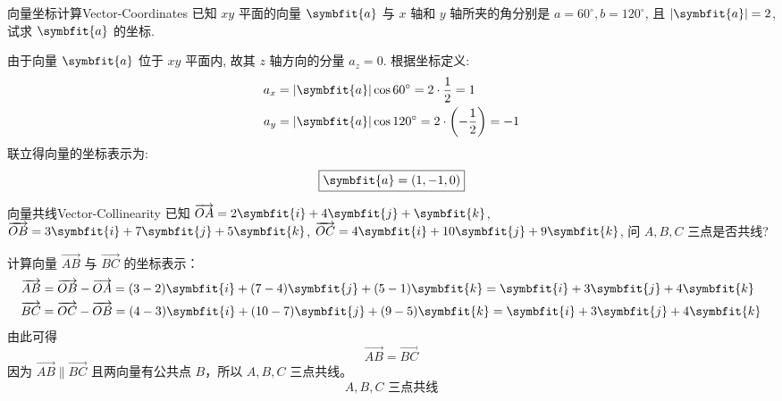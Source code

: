 \begin{problem}{向量坐标计算}{Vector-Coordinates}
    已知 $xy$ 平面的向量 $\symbfit{a}$ 与 $x$ 轴和 $y$ 轴所夹的角分别是 $a = 60^\circ, b = 120^\circ$, 且 $|\symbfit{a}| = 2$, 试求 $\symbfit{a}$ 的坐标.
\end{problem}

\begin{solution}
    由于向量 $\symbfit{a}$ 位于 $xy$ 平面内, 故其 $z$ 轴方向的分量 $a_z = 0$. 根据坐标定义:
    \begin{equation*}
        \begin{aligned}
            a_x & = |\symbfit{a}| \cos 60^\circ = 2 \cdot \frac{1}{2} = 1                   \\
            a_y & = |\symbfit{a}| \cos 120^\circ = 2 \cdot \left( -\frac{1}{2} \right) = -1
        \end{aligned}
    \end{equation*}
    联立得向量的坐标表示为:
    \begin{equation*}
        \boxed{\symbfit{a} = (1, -1, 0)}
    \end{equation*}
\end{solution}


\begin{problem}{向量共线}{Vector-Collinearity}
    已知 $\overrightarrow{OA} = 2\symbfit{i} + 4\symbfit{j} + \symbfit{k}$, $\overrightarrow{OB} = 3\symbfit{i} + 7\symbfit{j} + 5\symbfit{k}$, $\overrightarrow{OC} = 4\symbfit{i} + 10\symbfit{j} + 9\symbfit{k}$, 问 $A, B, C$ 三点是否共线?
\end{problem}

\begin{solution}
    计算向量 $\overrightarrow{AB}$ 与 $\overrightarrow{BC}$ 的坐标表示：
    \begin{equation*}
        \begin{aligned}
            \overrightarrow{AB} & = \overrightarrow{OB} - \overrightarrow{OA} = (3-2)\symbfit{i} + (7-4)\symbfit{j} + (5-1)\symbfit{k} = \symbfit{i} + 3\symbfit{j} + 4\symbfit{k}  \\
            \overrightarrow{BC} & = \overrightarrow{OC} - \overrightarrow{OB} = (4-3)\symbfit{i} + (10-7)\symbfit{j} + (9-5)\symbfit{k} = \symbfit{i} + 3\symbfit{j} + 4\symbfit{k}
        \end{aligned}
    \end{equation*}
    由此可得
    \begin{equation*}
        \overrightarrow{AB} = \overrightarrow{BC}
    \end{equation*}
    因为 $\overrightarrow{AB} \parallel \overrightarrow{BC}$ 且两向量有公共点 $B$，所以 $A, B, C$ 三点共线。
    \begin{equation*}
        \boxed{A, B, C \text{ 三点共线}}
    \end{equation*}
\end{solution}


